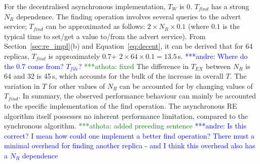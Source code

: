 \documentclass{rspublic}
\newcommand{\jhanote}[1]{ {\textcolor{red} { ***shantenu: #1 }}}
\newcommand{\alnote}[1]{ {\textcolor{blue} { ***andre: #1 }}}
\newcommand{\athotanote}[1]{ {\textcolor{green} { ***athota: #1 }}}
\newcommand{\alnote}[1]{}
\newcommand{\athotanote}[1]{}
\newcommand{\jhanote}[1]{}
\begin{document}


For the decentralised asynchronous implementation, $T_W$ is 0. 
$T_{find}$ has a strong $N_R$ dependence. 
The finding operation involves several queries to the advert
service; $T_{find}$ can be approximated as follows: $2 \times N_R \times 0.1$
(where $0.1$ is the typical time to set/get a value to/from the advert
service).  From  Section~\ref{sec:re_impl}(b) and Equation~\ref{eq:decent}, it can be derived
that for 64 replicas, $T_{find}$ is approximately $0.7$+ $2 \times 64 \times
0.1 = 13.5$\,s. \alnote{Where do the 0.7 come from? $T_{file}$?}  \athotanote{fixed}
The difference in $T_{EX}$ between $N_R$ is 64 and 32 is 45\,s, which accounts 
for the bulk of the increase in overall $T$. 
The variation in $T$ for other values of $N_R$ can be accounted for by changing
values of $T_{find}$.  In summary, the observed performance
behaviour can mainly be accounted to the specific implementation of the
find operation. The asynchronous RE algorithm itself possesses no inherent 
performance limitation, compared to the synchronous algorithm.
\athotanote{added preceding sentence} \alnote{Is this correct? I mean
how could one implement a better find operation? There must a minimal overhead
for finding another replica - and I think this overhead also 
has a $N_R$ dependence}
\end{document}
